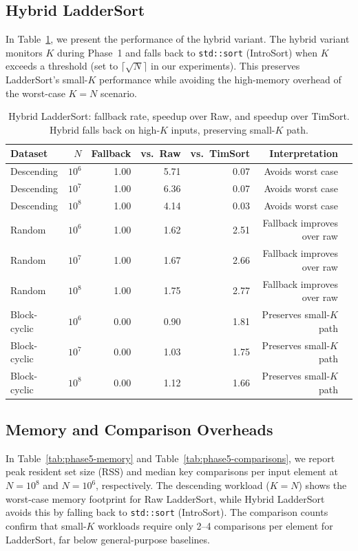 \documentclass{ieeeaccess}
\theoremstyle{plain}
\theoremstyle{definition}
\begin{document}
\subsection{Hybrid LadderSort}
\label{sec:hybrid}
In Table~\ref{tab:phase4-hybrid}, we present the performance of the hybrid variant. The hybrid variant monitors $K$ during Phase~1 and falls back to \texttt{std::sort} (IntroSort) when $K$ exceeds a threshold (set to $\lceil\sqrt{N}\rceil$ in our experiments). This preserves LadderSort's small-$K$ performance while avoiding the high-memory overhead of the worst-case $K = N$ scenario.

\begin{table}[t]
\centering\scriptsize
\caption{Hybrid LadderSort: fallback rate, speedup over Raw, and speedup over
  TimSort.  Hybrid falls back on high-$K$ inputs, preserving small-$K$ path.}
\label{tab:phase4-hybrid}
\begin{tabularx}{\linewidth}{@{}lrrrrrX@{}}
\toprule
Dataset & $N$ & Fallback & vs.\ Raw & vs.\ TimSort & Interpretation \\
\midrule
Descending   & $10^6$ & 1.00 & 5.71 & 0.07 & Avoids worst case \\
Descending   & $10^7$ & 1.00 & 6.36 & 0.07 & Avoids worst case \\
Descending   & $10^8$ & 1.00 & 4.14 & 0.03 & Avoids worst case \\
Random       & $10^6$ & 1.00 & 1.62 & 2.51 & Fallback improves over raw \\
Random       & $10^7$ & 1.00 & 1.67 & 2.66 & Fallback improves over raw \\
Random       & $10^8$ & 1.00 & 1.75 & 2.77 & Fallback improves over raw \\
Block-cyclic & $10^6$ & 0.00 & 0.90 & 1.81 & Preserves small-$K$ path \\
Block-cyclic & $10^7$ & 0.00 & 1.03 & 1.75 & Preserves small-$K$ path \\
Block-cyclic & $10^8$ & 0.00 & 1.12 & 1.66 & Preserves small-$K$ path \\
\bottomrule
\end{tabularx}
\end{table}

\subsection{Memory and Comparison Overheads}
\label{sec:overhead}


In Table~\ref{tab:phase5-memory} and Table~\ref{tab:phase5-comparisons}, we report peak resident set size (RSS) and median key comparisons per input element at $N=10^8$ and $N=10^6$, respectively.  The descending workload ($K=N$) shows the worst-case memory footprint for Raw LadderSort, while Hybrid LadderSort avoids this by falling back to \texttt{std::sort} (IntroSort).  The comparison counts confirm that small-$K$ workloads require only 2--4 comparisons per element for LadderSort, far below general-purpose baselines. 
\end{document}
